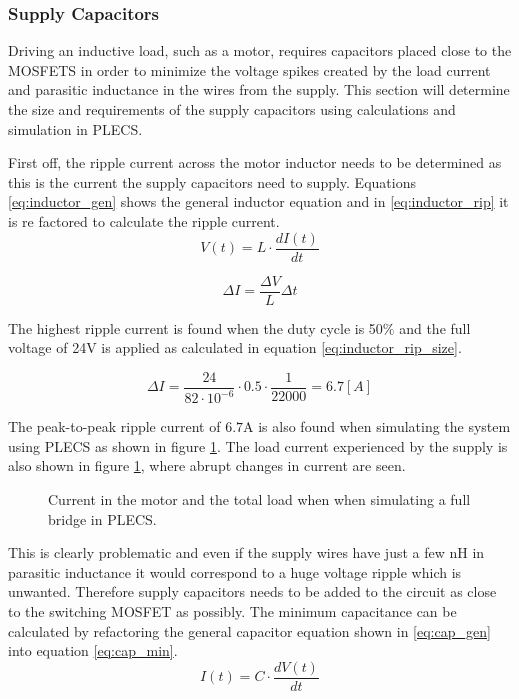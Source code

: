 \subsubsection{Supply Capacitors}
\label{ssub:sup_caps}
Driving an inductive load, such as a motor, requires capacitors placed close to the MOSFETS in order to minimize the voltage spikes created by the load current and parasitic inductance in the wires from the supply.
This section will determine the size and requirements of the supply capacitors using calculations and simulation in PLECS.

First off, the ripple current across the motor inductor needs to be determined as this is the current the supply capacitors need to supply.
Equations \ref{eq:inductor_gen} shows the general inductor equation and in \ref{eq:inductor_rip} it is re factored to calculate the ripple current.
\begin{equation}
	V(t) = L \cdot \frac{dI(t)}{dt}
	\label{eq:inductor_gen}
\end{equation}

\begin{equation}
	\Delta I = \frac{\Delta V}{L} \Delta t
	\label{eq:inductor_rip}
\end{equation}

The highest ripple current is found when the duty cycle is 50$\%$ and the full voltage of 24V is applied as calculated in equation \ref{eq:inductor_rip_size}.

\begin{equation}
	\Delta I = \frac{24}{82\cdot 10^{-6}} \cdot 0.5 \cdot \frac{1}{22000} = 6.7 [A] 
	\label{eq:inductor_rip_size}
\end{equation}

The peak-to-peak ripple current of $6.7$A is also found when simulating the system using PLECS as shown in figure \ref{fig:sim_currents}.
The load current experienced by the supply is also shown in figure \ref{fig:sim_currents}, where abrupt changes in current are seen. 

\begin{figure}[h]
	\centering
    
	\caption{Current in the motor and the total load when when simulating a full bridge in PLECS.}
	\label{fig:sim_currents}
\end{figure}

This is clearly problematic and even if the supply wires have just a few nH in parasitic inductance it would correspond to a huge voltage ripple which is unwanted. 
Therefore supply capacitors needs to be added to the circuit as close to the switching MOSFET as possibly.
The minimum capacitance can be calculated by refactoring the general capacitor equation shown in \ref{eq:cap_gen} into equation \ref{eq:cap_min}.
\begin{equation} 
	I(t) = C \cdot \frac{dV(t)}{dt}
	\label{eq:cap_gen}
\end{equation}

